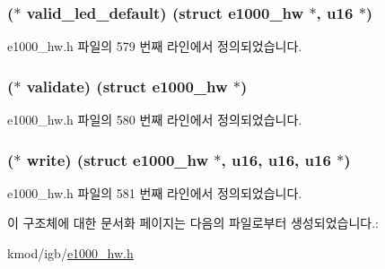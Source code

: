 \subsubsection[{\texorpdfstring{valid\+\_\+led\+\_\+default}{valid_led_default}}]{($\ast$ valid\+\_\+led\+\_\+default) (struct {\bf e1000\+\_\+hw} $\ast$, {\bf u16} $\ast$)}\hypertarget{structe1000__nvm__operations_ac7a5a4a2819c68f6a87aa59d9f365eac}{}\label{structe1000__nvm__operations_ac7a5a4a2819c68f6a87aa59d9f365eac}


e1000\+\_\+hw.\+h 파일의 579 번째 라인에서 정의되었습니다.

\subsubsection[{\texorpdfstring{validate}{validate}}]{($\ast$ validate) (struct {\bf e1000\+\_\+hw} $\ast$)}\hypertarget{structe1000__nvm__operations_a3bb1c3774b8f27706478ebdb0996cd72}{}\label{structe1000__nvm__operations_a3bb1c3774b8f27706478ebdb0996cd72}


e1000\+\_\+hw.\+h 파일의 580 번째 라인에서 정의되었습니다.

\subsubsection[{\texorpdfstring{write}{write}}]{($\ast$ write) (struct {\bf e1000\+\_\+hw} $\ast$, {\bf u16}, {\bf u16}, {\bf u16} $\ast$)}\hypertarget{structe1000__nvm__operations_ad977e40c9bb9fb3573455e2614560108}{}\label{structe1000__nvm__operations_ad977e40c9bb9fb3573455e2614560108}


e1000\+\_\+hw.\+h 파일의 581 번째 라인에서 정의되었습니다.



이 구조체에 대한 문서화 페이지는 다음의 파일로부터 생성되었습니다.\+:\begin{DoxyCompactItemize}
\item 
kmod/igb/\hyperlink{kmod_2igb_2e1000__hw_8h}{e1000\+\_\+hw.\+h}\end{DoxyCompactItemize}
